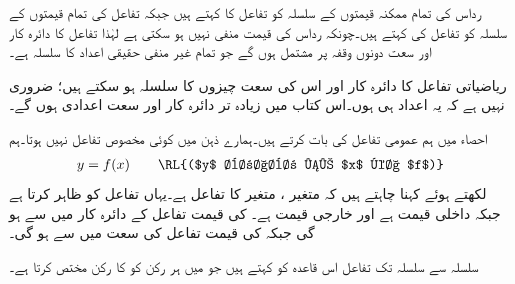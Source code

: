 رداس کی تمام ممکنہ قیمتوں کے سلسلہ کو تفاعل کا  کہتے ہیں جبکہ تفاعل کی تمام قیمتوں کے سلسلہ کو تفاعل کی  کہتے ہیں۔چونکہ رداس کی قیمت منفی نہیں ہو سکتی ہے لہٰذا تفاعل کا دائرہ کار اور سعت دونوں  وقفہ \عددی{[0,\infty)} پر مشتمل ہوں گے جو تمام غیر منفی حقیقی اعداد کا سلسلہ ہے۔

ریاضیاتی تفاعل کا دائرہ کار اور اس کی سعت چیزوں کا سلسلہ ہو سکتے ہیں؛ ضروری نہیں ہے کہ یہ اعداد ہی ہوں۔اس کتاب میں زیادہ تر دائرہ کار اور سعت اعدادی ہوں گے۔

احصاء میں ہم عمومی تفاعل کی بات کرتے ہیں۔ہمارے ذہن میں کوئی مخصوص تفاعل نہیں ہوتا۔ہم
\begin{align*}
y=f(x)\quad \quad \text{\RL{($y$ برابر ہے $x$ کا $f$)}}
\end{align*}
لکھتے ہوئے کہنا چاہتے ہیں کہ متغیر ، متغیر   کا تفاعل  ہے۔یہاں  تفاعل کو ظاہر کرتا ہے جبکہ داخلی قیمت   ہے اور خارجی قیمت   ہے۔ کی قیمت تفاعل کے دائرہ کار میں  سے ہو گی جبکہ  کی قیمت تفاعل کی سعت میں سے ہو گی۔ 

سلسلہ  سے سلسلہ  تک تفاعل  اس قاعدہ کو کہتے ہیں جو  میں ہر رکن  کو  کا  رکن  مختص کرتا ہے۔

